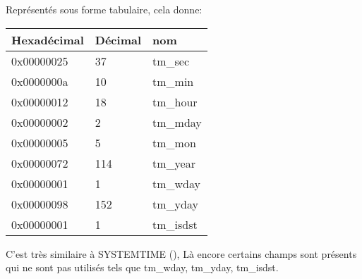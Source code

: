 Représentés sous forme tabulaire, cela donne:

\begin{center}
\begin{tabular}{ | l | l | l | }
\hline
\headercolor{} Hexadécimal & 
\headercolor{} Décimal & 
\headercolor{} nom \\
\hline
0x00000025 & 37 	& tm\_sec \\
\hline
0x0000000a & 10 	& tm\_min \\
\hline
0x00000012 & 18 	& tm\_hour \\	
\hline
0x00000002 & 2 		& tm\_mday \\	
\hline
0x00000005 & 5 		& tm\_mon \\	
\hline
0x00000072 & 114 	& tm\_year \\
\hline
0x00000001 & 1 		& tm\_wday \\	
\hline
0x00000098 & 152 	& tm\_yday \\	
\hline
0x00000001 & 1 		& tm\_isdst \\
\hline
\end{tabular}
\end{center}

C'est très similaire à SYSTEMTIME (),
Là encore certains champs sont présents qui ne sont pas utilisés tels que tm\_wday, tm\_yday,
tm\_isdst.
